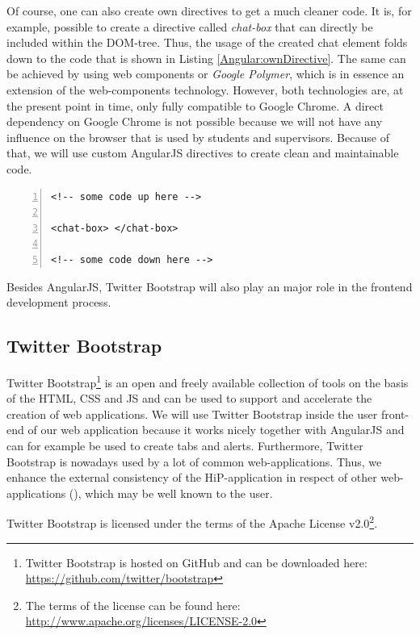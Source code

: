 Of course, one can also create own directives to get a much cleaner code. It is, for example, possible to create a directive called \textit{chat-box} that can directly be included within the \ac{DOM}-tree. Thus, the usage of the created chat element folds down to the code that is shown in Listing \ref{Angular:ownDirective}. The same can be achieved by using web components or \emph{Google Polymer}, which is in essence an extension of the web-components technology. However, both technologies are, at the present point in time, only fully compatible to Google Chrome. A direct dependency on Google Chrome is not possible because we will not have any influence on the browser that is used by students and supervisors. Because of that, we will use custom AngularJS directives to create clean and maintainable code.

\begin{lstlisting}[numbers=left,caption={Simple example that shows the usage of a custom directive},label=Angular:ownDirective,frame=tlbr,breaklines]
<!-- some code up here -->

<chat-box> </chat-box>

<!-- some code down here -->
\end{lstlisting}

Besides AngularJS, Twitter Bootstrap will also play an major role in the frontend development process.
 
\subsection{Twitter Bootstrap}
Twitter Bootstrap\footnote{Twitter Bootstrap is hosted on GitHub and can be downloaded here: \url{https://github.com/twitter/bootstrap}} is an open and freely available collection of tools on the basis of the \ac{HTML}, \ac{CSS} and \ac{JS} and can be used to support and accelerate the creation of web applications. We will use Twitter Bootstrap inside the user front-end of our web application because it works nicely together with AngularJS and can for example be used to create tabs and alerts. Furthermore, Twitter Bootstrap is nowadays used by a lot of common web-applications. Thus, we enhance the external consistency of the \ac{HiP}-application in respect of other web-applications (\cite{lidwell2010universal}), which may be well known to the user. 

Twitter Bootstrap is licensed under the terms of the Apache License v2.0\footnote{The terms of the license can be found here: \url{http://www.apache.org/licenses/LICENSE-2.0}}.

